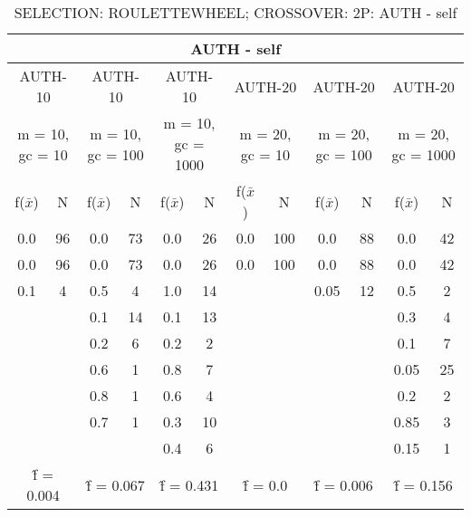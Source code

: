 \begin{table}[H]
	\centering
	\caption{SELECTION: ROULETTEWHEEL; CROSSOVER: 2P: AUTH - self}
	\begin{adjustbox}{width=1\textwidth}
		\begin{tabular}{ |c|c||c|c||c|c||c|c||c|c||c|c| }
			\hline
			\multicolumn{12}{|c|}{AUTH - self} \\
			\hline
			\multicolumn{2}{|c||}{AUTH-10} & \multicolumn{2}{c||}{AUTH-10} & \multicolumn{2}{c||}{AUTH-10} & \multicolumn{2}{c||}{AUTH-20} & \multicolumn{2}{c||}{AUTH-20} & \multicolumn{2}{c|}{AUTH-20}\\
			\hline
			\multicolumn{2}{|c||}{m = 10, gc = 10} & \multicolumn{2}{c||}{m = 10, gc = 100} & \multicolumn{2}{c||}{m = 10, gc = 1000} & \multicolumn{2}{c||}{m = 20, gc = 10} & \multicolumn{2}{c||}{m = 20, gc = 100} & \multicolumn{2}{c|}{m = 20, gc = 1000}\\
			\hline
			f($\bar{x}$) & N & f($\bar{x}$) & N & f($\bar{x}$) & N & f($\bar{x}$) & N & f($\bar{x}$) & N & f($\bar{x}$) & N\\
			\hline
			\hline
			0.0 & 96 & 0.0 & 73 & 0.0 & 26 & 0.0 & 100 & 0.0 & 88 & 0.0 & 42\\
			\hline
			0.0 & 96 & 0.0 & 73 & 0.0 & 26 & 0.0 & 100 & 0.0 & 88 & 0.0 & 42\\
			0.1 & 4 & 0.5 & 4 & 1.0 & 14 &   &   & 0.05 & 12 & 0.5 & 2\\
			&   & 0.1 & 14 & 0.1 & 13 &   &   &   &   & 0.3 & 4\\
			&   & 0.2 & 6 & 0.2 & 2 &   &   &   &   & 0.1 & 7\\
			&   & 0.6 & 1 & 0.8 & 7 &   &   &   &   & 0.05 & 25\\
			&   & 0.8 & 1 & 0.6 & 4 &   &   &   &   & 0.2 & 2\\
			&   & 0.7 & 1 & 0.3 & 10 &   &   &   &   & 0.85 & 3\\
			&   &   &   & 0.4 & 6 &   &   &   &   & 0.15 & 1\\
			\hline
			\multicolumn{2}{|c||}{\^{f} = 0.004} & \multicolumn{2}{c||}{\^{f} = 0.067} & \multicolumn{2}{c||}{\^{f} = 0.431} & \multicolumn{2}{c||}{\^{f} = 0.0} & \multicolumn{2}{c||}{\^{f} = 0.006} & \multicolumn{2}{c|}{\^{f} = 0.156}\\
			\hline
		\end{tabular}
	\end{adjustbox}
\end{table}
